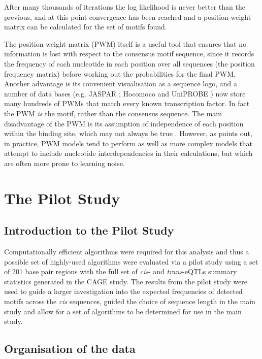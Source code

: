 \documentclass[12pt]{article}
\begin{document}
After many thousands of iterations the log likelihood is never better than the previous, and at this point convergence has been reached and a position weight matrix can be calculated for the set of motifs found.

The position weight matrix (PWM) itself is a useful tool that ensures that no information is lost with respect to the consensus motif sequence, since it records the frequency of each nucleotide in each position over all sequences (the position frequency matrix) before working out the probabilities for the final PWM. Another advantage is its convenient visualisation as a sequence logo, and a number of data bases (e.g. JASPAR \citep{Mathelier2016}; Hocomoco \citep{Kulakovskiy2018} and UniPROBE \citep{Hume2015}) now store many hundreds of PWMs that match every known transcription factor. In fact the PWM \textit{is} the motif, rather than the consensus sequence. The main disadvantage of the PWM is its assumption of independence of each position within the binding site, which may not always be true \citep{Jayaram2016}. However, as \citet{Jayaram2016} points out, in practice, PWM models tend to perform as well as more complex models that attempt to include nucleotide interdependencies in their calculations, but which are often more prone to learning noise.

\section{The Pilot Study}
\subsection{Introduction to the Pilot Study}
Computationally efficient algorithms were required for this analysis and thus a possible set of highly-used algorithms were evaluated via a pilot study using a set of 201 base pair regions with the full set of \emph{cis}- and \emph{trans}-eQTLs summary statistics generated in the CAGE study. The results from the pilot study were used to guide a larger investigation into the expected frequencies of detected motifs across the \emph{cis} sequences, guided the choice
of sequence length in the main study and allow for a set of algorithms to be determined for use in the main study.




\subsection{Organisation of the data}
\end{document}
